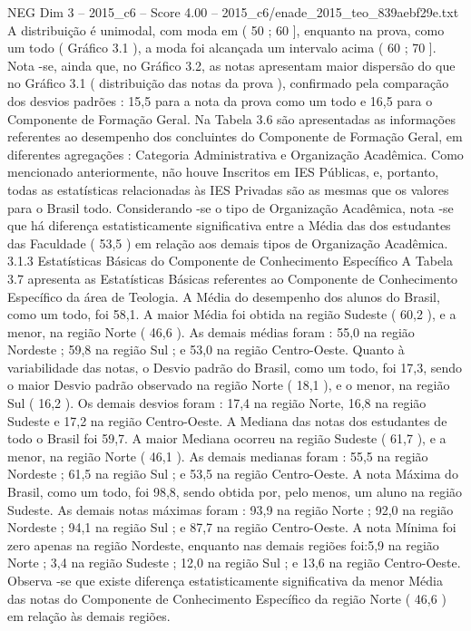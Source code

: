 \begin{textsample}{NEG Dim 3 – 2015\_c6 – Score 4.00 – 2015\_c6/enade\_2015\_teo\_839aebf29e.txt}
A distribuição é unimodal, com moda em ( 50 ; 60 ], enquanto na prova, como um todo ( Gráfico 3.1 ), a moda foi alcançada um intervalo acima ( 60 ; 70 ].
Nota -se, ainda que, no Gráfico 3.2, as notas apresentam maior dispersão do que no Gráfico 3.1 ( distribuição das notas da prova ), confirmado pela comparação dos desvios padrões : 15,5 para a nota da prova como um todo e 16,5 para o Componente de Formação Geral.
Na Tabela 3.6 são apresentadas as informações referentes ao desempenho dos concluintes do Componente de Formação Geral, em diferentes agregações : Categoria Administrativa e Organização Acadêmica.
Como mencionado anteriormente, não houve Inscritos em IES Públicas, e, portanto, todas as estatísticas relacionadas às IES Privadas são as mesmas que os valores para o Brasil todo.
Considerando -se o tipo de Organização Acadêmica, nota -se que há diferença estatisticamente significativa entre a Média das dos estudantes das Faculdade ( 53,5 ) em relação aos demais tipos de Organização Acadêmica. 3.1.3 Estatísticas Básicas do Componente de Conhecimento Específico A Tabela 3.7 apresenta as Estatísticas Básicas referentes ao Componente de Conhecimento Específico da área de Teologia.
A Média do desempenho dos alunos do Brasil, como um todo, foi 58,1.
A maior Média foi obtida na região Sudeste ( 60,2 ), e a menor, na região Norte ( 46,6 ).
As demais médias foram : 55,0 na região Nordeste ; 59,8 na região Sul ; e 53,0 na região Centro-Oeste.
Quanto à variabilidade das notas, o Desvio padrão do Brasil, como um todo, foi 17,3, sendo o maior Desvio padrão observado na região Norte ( 18,1 ), e o menor, na região Sul ( 16,2 ).
Os demais desvios foram : 17,4 na região Norte, 16,8 na região Sudeste e 17,2 na região Centro-Oeste.
A Mediana das notas dos estudantes de todo o Brasil foi 59,7.
A maior Mediana ocorreu na região Sudeste ( 61,7 ), e a menor, na região Norte ( 46,1 ).
As demais medianas foram : 55,5 na região Nordeste ; 61,5 na região Sul ; e 53,5 na região Centro-Oeste.
A nota Máxima do Brasil, como um todo, foi 98,8, sendo obtida por, pelo menos, um aluno na região Sudeste.
As demais notas máximas foram : 93,9 na região Norte ; 92,0 na região Nordeste ; 94,1 na região Sul ; e 87,7 na região Centro-Oeste.
A nota Mínima foi zero apenas na região Nordeste, enquanto nas demais regiões foi:5,9 na região Norte ; 3,4 na região Sudeste ; 12,0 na região Sul ; e 13,6 na região Centro-Oeste.
Observa -se que existe diferença estatisticamente significativa da menor Média das notas do Componente de Conhecimento Específico da região Norte ( 46,6 ) em relação às demais regiões.

\end{textsample}
